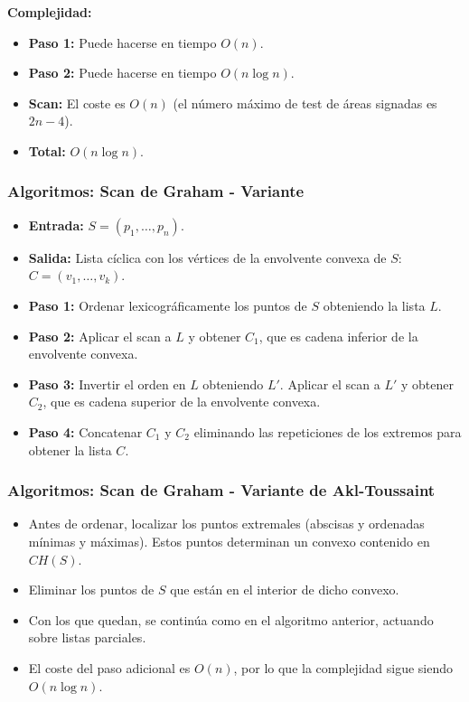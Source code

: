 \documentclass[twoside]{report}
\begin{document}
{\bf Complejidad:}

\begin{itemize}
  \item\textbf{Paso 1:} Puede hacerse en tiempo $O(n)$.
  \item\textbf{Paso 2:} Puede hacerse en tiempo $O(n\log n)$.
  \item\textbf{Scan:} El coste es $O(n)$ (el número máximo de test de
áreas signadas es $2n-4$).
  \item\textbf{Total:} $O(n\log n)$.
\end{itemize}

\subsubsection{Algoritmos: Scan de Graham - Variante}

\begin{itemize}
  \item\textbf{Entrada:} $S=(p_1,\dots,p_n)$.
  \item\textbf{Salida:} Lista cíclica con los vértices de la envolvente
convexa de $S$: $C=(v_1,\dots,v_k)$.
  \item\textbf{Paso 1:} Ordenar lexicográficamente los puntos de $S$
obteniendo la lista $L$.
  \item\textbf{Paso 2:} Aplicar el scan a $L$ y obtener $C_1$, que es
cadena inferior de la envolvente convexa.
  \item\textbf{Paso 3:} Invertir el orden en $L$ obteniendo $L'$. Aplicar
el scan a $L'$ y obtener $C_2$, que es cadena superior de la
envolvente convexa.
  \item\textbf{Paso 4:} Concatenar $C_1$ y $C_2$ eliminando las
repeticiones de los extremos para obtener la lista $C$.
\end{itemize}

\subsubsection{Algoritmos: Scan de Graham - Variante de Akl-Toussaint}

\begin{itemize}
  \item Antes de ordenar, localizar los puntos extremales (abscisas
y ordenadas mínimas y máximas). Estos puntos determinan un convexo
contenido en $CH(S)$.
  \item Eliminar los puntos de $S$ que están en el interior de dicho
convexo.
  \item Con los que quedan, se continúa como en el algoritmo
anterior, actuando sobre listas parciales.
  \item El coste del paso adicional es $O(n)$, por lo que la
complejidad sigue siendo $O(n\log n)$.
\end{itemize}
\end{document}
